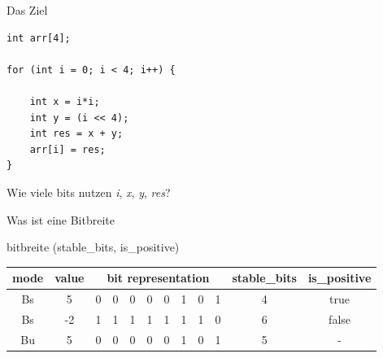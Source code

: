 
\begin{frame}[fragile]{Das Ziel}
\begin{lstlisting}
int arr[4];

for (int i = 0; i < 4; i++) {

	int x = i*i;      
	int y = (i << 4); 
	int res = x + y;  
	arr[i] = res;
}
\end{lstlisting}
Wie viele bits nutzen \textit{i}, \textit{x}, \textit{y}, \textit{res}? \newline
\end{frame}

\begin{frame}{Was ist eine Bitbreite}
\begin{center}
	\begin{definition}{bitbreite}
		(stable\_bits, is\_positive)
	\end{definition}
\end{center}

\begin{tabular}{ c c | c c c c c c c c | c c }
	mode & value & \multicolumn{8}{c|}{bit representation} & stable\_bits & is\_positive \\
	\hline
	\hline
	Bs & 5     & \color{red}0 & \color {red}0 & \color{red}0 & \color{red}0 & 0 & 1 & 0 & 1 & 4 & true\\
	Bs & -2    & \color{red}1 & \color{red}1 & \color{red}1 & \color{red}1 & \color{red}1 & \color{red}1 & 1 & 0 & 6 & false\\
    Bu & 5     & \color{red}0 & \color{red}0 & \color{red}0 & \color{red}0 & \color{red}0 & 1 & 0 & 1 & 5 & - \\
\end{tabular}

\end{frame}



